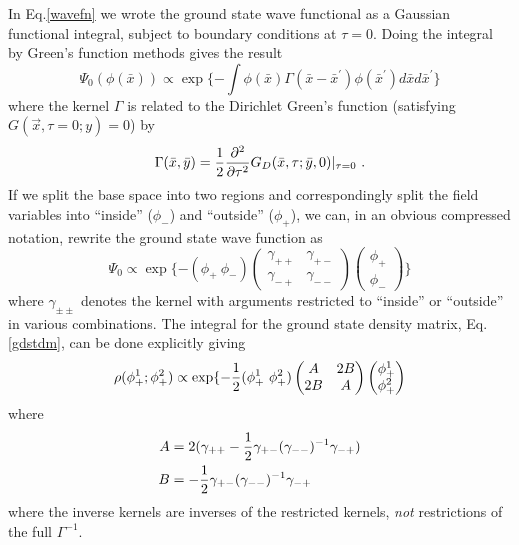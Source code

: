 \documentclass[12pt]{article}
\begin{document}
In Eq.\ref{wavefn} we wrote the ground state wave functional as a Gaussian
functional integral, subject to boundary conditions at
$\tau=0$. Doing the integral by Green's function methods gives the result
\begin{equation}
\Psi_0 (\phi(\bar x)) \propto \exp\{-\int \phi(\bar x)
	\Gamma(\bar x-\bar x^\prime)\phi(\bar x^\prime)d\bar xd\bar x^\prime\}
\end{equation}
where the kernel $\Gamma$ is related to the Dirichlet Green's function
(satisfying $G(\vec x,\tau=0;y)=0$) by
\begin{equation}
\Gamma(\bar x,\bar y) = {1\over 2} {\partial^2 \over \partial \tau ^2}
	G_D(\bar x,\tau;\bar y,0)|_{\tau=0}~.
\label{kernel}
\end{equation}
If we split the base space into two regions and correspondingly split the
field variables into ``inside'' ($\phi_-$) and ``outside'' ($\phi_+$), we can,
in an obvious compressed notation, rewrite the ground state wave function as
\begin{equation}
\Psi_0 \propto \exp\{-(\phi_+~ \phi_-)
\begin{pmatrix}
\gamma_{++}&\gamma_{+-}\\\gamma_{-+}&\gamma_{--}
\end{pmatrix}
\begin{pmatrix}
\phi_+ \\ \phi_-
\end{pmatrix} \}
\end{equation}
where $\gamma_{\pm\pm}$ denotes the kernel with arguments restricted to
``inside'' or ``outside'' in various combinations. The integral for the
ground state density matrix, Eq.\ref{gdstdm}, can be done explicitly giving
\begin{equation}
\rho(\phi^1_+; \phi^2_+) \propto
	\exp\{-{1\over 2}(\phi_+^1~ \phi_+^2) 
\begin{pmatrix}
A&2B\\ 2B&A
\end{pmatrix}
\begin{pmatrix}
\phi_+^1 \\ \phi_+^2
\end{pmatrix}
\label{gaussdm}
\end{equation}
where
\begin{align}
A &= 2(\gamma_{++} -{1 \over 2} \gamma_{+-} (\gamma_{--})^{-1} \gamma_{-+})\\
B &= -{1\over2} \gamma_{+-} (\gamma_{--})^{-1} \gamma_{-+}\\
\label{ABdm}
\end{align}
where the inverse kernels are inverses of the restricted kernels, {\it not}
restrictions of the full $\Gamma^{-1}$.
\end{document}
